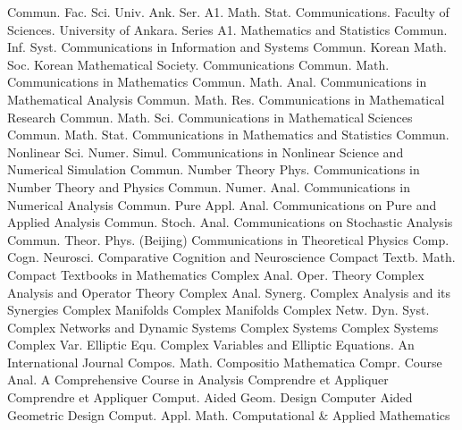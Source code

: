 {Commun. Fac. Sci. Univ. Ank. Ser. A1. Math. Stat.}
{Communications. Faculty of Sciences. University of Ankara. Series A1. Mathematics and Statistics}
{Commun. Inf. Syst.}
{Communications in Information and Systems}
{Commun. Korean Math. Soc.}
{Korean Mathematical Society. Communications}
{Commun. Math.}
{Communications in Mathematics}
{Commun. Math. Anal.}
{Communications in Mathematical Analysis}
{Commun. Math. Res.}
{Communications in Mathematical Research}
{Commun. Math. Sci.}
{Communications in Mathematical Sciences}
{Commun. Math. Stat.}
{Communications in Mathematics and Statistics}
{Commun. Nonlinear Sci. Numer. Simul.}
{Communications in Nonlinear Science and Numerical Simulation}
{Commun. Number Theory Phys.}
{Communications in Number Theory and Physics}
{Commun. Numer. Anal.}
{Communications in Numerical Analysis}
{Commun. Pure Appl. Anal.}
{Communications on Pure and Applied Analysis}
{Commun. Stoch. Anal.}
{Communications on Stochastic Analysis}
{Commun. Theor. Phys. (Beijing)}
{Communications in Theoretical Physics}
{Comp. Cogn. Neurosci.}
{Comparative Cognition and Neuroscience}
{Compact Textb. Math.}
{Compact Textbooks in Mathematics}
{Complex Anal. Oper. Theory}
{Complex Analysis and Operator Theory}
{Complex Anal. Synerg.}
{Complex Analysis and its Synergies}
{Complex Manifolds}
{Complex Manifolds}
{Complex Netw. Dyn. Syst.}
{Complex Networks and Dynamic Systems}
{Complex Systems}
{Complex Systems}
{Complex Var. Elliptic Equ.}
{Complex Variables and Elliptic Equations. An International Journal}
{Compos. Math.}
{Compositio Mathematica}
{Compr. Course Anal.}
{A Comprehensive Course in Analysis}
{Comprendre et Appliquer}
{Comprendre et Appliquer}
{Comput. Aided Geom. Design}
{Computer Aided Geometric Design}
{Comput. Appl. Math.}
{Computational & Applied Mathematics}
